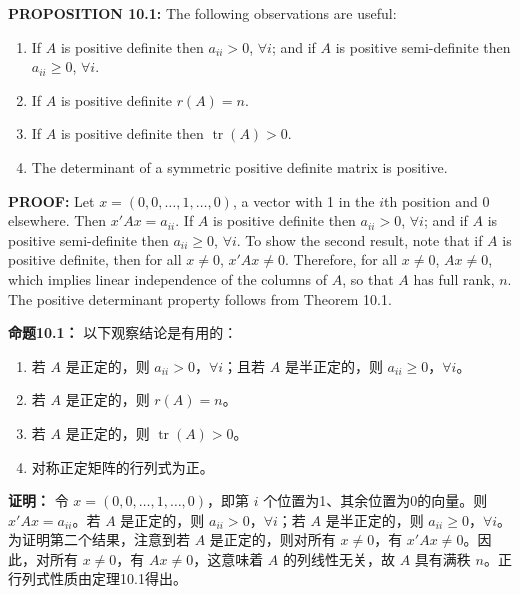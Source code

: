 \begin{original}
\textbf{PROPOSITION 10.1:} The following observations are useful:
\begin{enumerate}
\item If $A$ is positive definite then $a_{ii} > 0$, $\forall i$; and if $A$ is positive semi-definite then $a_{ii} \geq 0$, $\forall i$.
\item If $A$ is positive definite $r(A) = n$.
\item If $A$ is positive definite then $\operatorname{tr}(A) > 0$.
\item The determinant of a symmetric positive definite matrix is positive.
\end{enumerate}

\textbf{PROOF:} Let $x = (0,0,\ldots,1,\ldots,0)$, a vector with 1 in the $i$th position and 0 elsewhere. Then $x'Ax = a_{ii}$. If $A$ is positive definite then $a_{ii} > 0$, $\forall i$; and if $A$ is positive semi-definite then $a_{ii} \geq 0$, $\forall i$. To show the second result, note that if $A$ is positive definite, then for all $x \neq 0$, $x'Ax \neq 0$. Therefore, for all $x \neq 0$, $Ax \neq 0$, which implies linear independence of the columns of $A$, so that $A$ has full rank, $n$. The positive determinant property follows from Theorem 10.1.
\end{original}
\begin{translation}
\textbf{命题10.1：} 以下观察结论是有用的：
\begin{enumerate}
\item 若 $A$ 是正定的，则 $a_{ii} > 0$，$\forall i$；且若 $A$ 是半正定的，则 $a_{ii} \geq 0$，$\forall i$。
\item 若 $A$ 是正定的，则 $r(A) = n$。
\item 若 $A$ 是正定的，则 $\operatorname{tr}(A) > 0$。
\item 对称正定矩阵的行列式为正。
\end{enumerate}

\textbf{证明：} 令 $x = (0,0,\ldots,1,\ldots,0)$，即第 $i$ 个位置为1、其余位置为0的向量。则 $x'Ax = a_{ii}$。若 $A$ 是正定的，则 $a_{ii} > 0$，$\forall i$；若 $A$ 是半正定的，则 $a_{ii} \geq 0$，$\forall i$。为证明第二个结果，注意到若 $A$ 是正定的，则对所有 $x \neq 0$，有 $x'Ax \neq 0$。因此，对所有 $x \neq 0$，有 $Ax \neq 0$，这意味着 $A$ 的列线性无关，故 $A$ 具有满秩 $n$。正行列式性质由定理10.1得出。
\end{translation}

